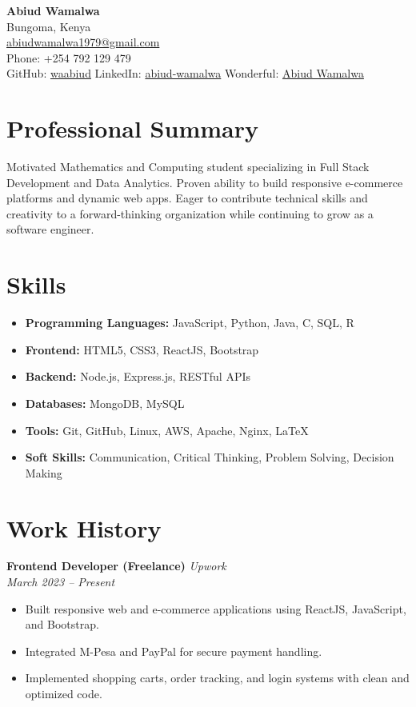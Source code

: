 \documentclass[a4paper,10pt]{article}
\begin{document}
\begin{center}
    {\Huge \textbf{Abiud Wamalwa}}\\
    Bungoma, Kenya \\
    \href{mailto:abiudwamalwa1979@gmail.com}{abiudwamalwa1979@gmail.com} \\
    Phone: +254 792 129 479 \\
    GitHub: \href{https://github.com/waabiud}{waabiud} \quad
    LinkedIn: \href{https://linkedin.com/in/abiud-wamalwa}{abiud-wamalwa} \quad
    Wonderful: \href{https://wonderful.dev/waabiud}{Abiud Wamalwa}
\end{center}

\section*{Professional Summary}
Motivated Mathematics and Computing student specializing in Full Stack Development and Data Analytics. Proven ability to build responsive e-commerce platforms and dynamic web apps. Eager to contribute technical skills and creativity to a forward-thinking organization while continuing to grow as a software engineer.

\section*{Skills}
\begin{itemize}[leftmargin=*]
    \item \textbf{Programming Languages:} JavaScript, Python, Java, C, SQL, R
    \item \textbf{Frontend:} HTML5, CSS3, ReactJS, Bootstrap
    \item \textbf{Backend:} Node.js, Express.js, RESTful APIs
    \item \textbf{Databases:} MongoDB, MySQL
    \item \textbf{Tools:} Git, GitHub, Linux, AWS, Apache, Nginx, LaTeX
    \item \textbf{Soft Skills:} Communication, Critical Thinking, Problem Solving, Decision Making
\end{itemize}

\section*{Work History}
\textbf{Frontend Developer (Freelance)} \hfill \textit{Upwork} \\
\textit{March 2023 – Present}
\begin{itemize}[leftmargin=*]
    \item Built responsive web and e-commerce applications using ReactJS, JavaScript, and Bootstrap.
    \item Integrated M-Pesa and PayPal for secure payment handling.
    \item Implemented shopping carts, order tracking, and login systems with clean and optimized code.
\end{itemize}
\end{document}
